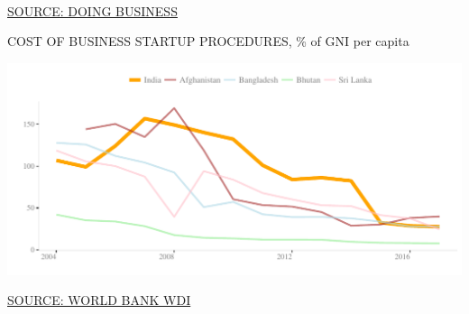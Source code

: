 \documentclass{article}\usepackage[]{graphicx}\usepackage[]{color}
\makeatletter
\def\maxwidth{ %
  \ifdim\Gin@nat@width>\linewidth
    \linewidth
  \else
    \Gin@nat@width
  \fi
}
\makeatother
\begin{document}
\begin{minipage}[b]{0.95\textwidth}
\begin{minipage}[c]{0.50\textwidth}
{      }
    \\[6pt]
     \hspace{1ex}\scriptsize{\href{NA}{\textcolor[HTML]{22A6F5}{SOURCE: DOING BUSINESS}}}
  \end{minipage}
    \begin{minipage}[c]{0.42\textwidth} 
    \hspace{4ex}\small{\textcolor[HTML]{818181}{COST OF BUSINESS STARTUP PROCEDURES, \% of GNI per capita}}
    


\hfill{}\includegraphics[width=\maxwidth]{figure/line_chart_Policy-1} 



    \hspace{4ex}\scriptsize{\href{NA}{\textcolor[HTML]{22A6F5}{SOURCE: WORLD BANK WDI}}} 
  \end{minipage}
\end{minipage}

\end{document}
